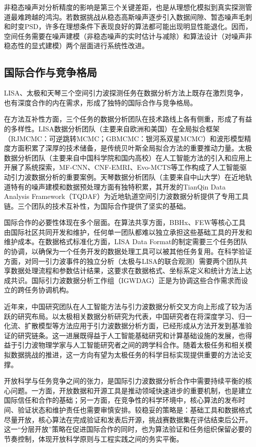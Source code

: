 非稳态噪声对分析精度的影响是第三个关键差距，也是从理想化模拟到真实探测管道最难跨越的鸿沟。若数据挑战从稳态高斯噪声逐步引入数据间隙、暂态噪声毛刺和时变PSD，许多在理想条件下表现良好的算法都可能出现明显性能退化。因而，空间任务需要在噪声建模（非稳态噪声的实时估计与减除）和算法设计（对噪声非稳态性的显式建模）两个层面进行系统性改进。

\subsection{国际合作与竞争格局}

LISA、太极和天琴三个空间引力波探测任务在数据分析方法上既存在激烈竞争，也有深度合作的内在需求，形成了独特的国际合作与竞争格局。

在方法互补性方面，三个任务的数据分析团队在技术路线上各有侧重，形成了有益的多样性。LISA数据分析团队（主要来自欧洲和美国）在全局拟合框架（RJMCMC：可逆跳转MCMC；GBMCMC：银河系双星MCMC）和波形模型精度方面积累了深厚的技术储备，是传统贝叶斯全局拟合方法的重要推动力量。太极数据分析团队（主要来自中国科学院和国内高校）在人工智能方法的引入和应用上开展了系统探索，MF-CNN、CNF-EMRI、Evo-MCTS等工作构成了人工智能驱动引力波数据分析的重要案例。天琴数据分析团队（主要来自中山大学）在近地轨道特有的噪声建模和数据预处理方面有独特积累，其开发的TianQin Data Analysis Framework（TQDAF）为近地轨道空间引力波数据分析提供了专用工具链。三个团队的技术互补性，为国际合作提供了坚实的基础。

国际合作的必要性体现在多个层面。在算法共享方面，BBHx、FEW等核心工具由国际社区共同开发和维护，任何单一团队都难以独立承担这些基础工具的开发和维护成本。在数据格式标准化方面，LISA Data Format的制定需要三个任务团队的协调，以确保为一个任务开发的数据处理工具可以被其他任务复用。在科学验证方面，对同一引力波事件的独立分析（太极与LISA的联合观测）需要两个团队共享数据处理流程和参数估计结果，这要求在数据格式、坐标系定义和统计方法上达成共识。国际引力波数据分析工作组（IGWDAG）正是为协调这些合作需求而设立的跨任务协调机构。

近年来，中国研究团队在人工智能方法与引力波数据分析交叉方向上形成了较为活跃的研究布局。以太极相关数据分析研究为代表，中国研究者在将深度学习、归一化流、扩散模型等方法应用于引力波数据分析方面，已经形成从方法开发到基准验证的研究链条。这一进展既得益于人工智能基础研究和计算基础设施的发展，也得益于引力波物理学家与人工智能研究者之间的跨学科合作。随着太极任务和相关模拟数据挑战的推进，这一方向有望为太极任务的科学目标实现提供重要的方法论支撑。

开放科学与任务竞争之间的张力，是国际引力波数据分析合作中需要持续平衡的核心问题。一方面，开放数据和开源工具是推动领域快速进步的重要机制，也是建立国际信任和合作的基础；另一方面，在竞争性的科学环境中，核心算法的发布时间、验证状态和维护责任也需要审慎安排。较稳妥的策略是：基础工具和数据格式尽量开放，核心算法在完成验证和发表后开源，挑战赛数据集在评估结束后公开。这一“分层开放”策略在促进国际合作的同时，也为算法验证和任务组织保留必要的节奏控制，体现开放科学原则与工程实践之间的务实平衡。

